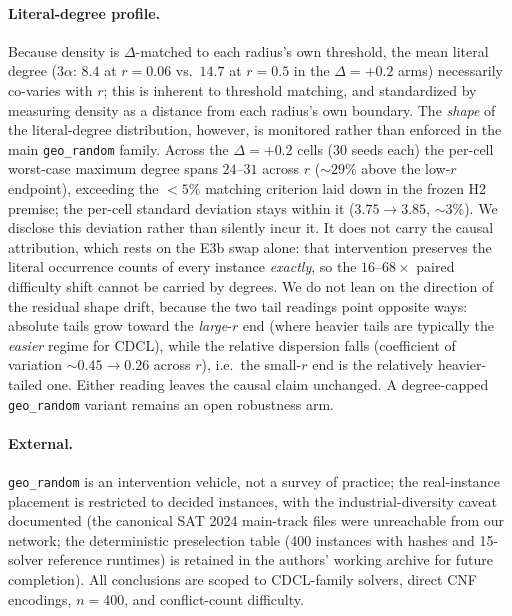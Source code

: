 \documentclass[11pt]{article}
\begin{document}
\paragraph{Literal-degree profile.}
Because density is $\Delta$-matched to each radius's own threshold, the mean
literal degree ($3\alpha$: $8.4$ at $r=0.06$ vs.\ $14.7$ at $r=0.5$ in the
$\Delta{=}{+}0.2$ arms) necessarily co-varies with $r$; this is inherent to
threshold matching, and standardized by measuring density as a distance from
each radius's own boundary. The \emph{shape} of the literal-degree
distribution, however, is monitored rather than enforced in the main
\texttt{geo\_random} family. Across the $\Delta{=}{+}0.2$ cells (30 seeds
each) the per-cell worst-case maximum degree spans $24$--$31$ across $r$
(${\sim}29\%$ above the low-$r$ endpoint), exceeding the ${<}5\%$ matching
criterion laid down in the frozen H2 premise; the per-cell standard
deviation stays within it ($3.75 \to 3.85$, ${\sim}3\%$). We disclose this
deviation rather than silently incur it. It does not carry the causal
attribution, which rests on the E3b swap alone: that intervention preserves
the literal occurrence counts of every instance \emph{exactly}, so the
$16$--$68\times$ paired difficulty shift cannot be carried by degrees. We do
not lean on the direction of the residual shape drift, because the two tail
readings point opposite ways: absolute tails grow toward the \emph{large}-$r$
end (where heavier tails are typically the \emph{easier} regime for CDCL),
while the relative dispersion falls (coefficient of variation ${\sim}0.45 \to
0.26$ across $r$), i.e.\ the small-$r$ end is the relatively heavier-tailed
one. Either reading leaves the causal claim unchanged. A degree-capped
\texttt{geo\_random} variant remains an open robustness arm.

\paragraph{External.}
\texttt{geo\_random} is an intervention vehicle, not a survey of practice;
the real-instance placement is restricted to decided instances, with the
industrial-diversity caveat documented (the canonical SAT 2024 main-track
files were unreachable from our network; the deterministic preselection table
(400 instances with hashes and 15-solver reference runtimes) is retained
in the authors' working archive for future completion). All conclusions are scoped to CDCL-family solvers, direct CNF
encodings, $n=400$, and conflict-count difficulty.
\end{document}
